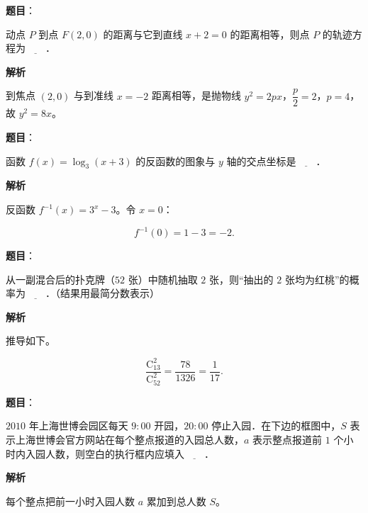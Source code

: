 \begin{answer}

\textbf{题目}：

动点 $P$ 到点 $F(2,0)$ 的距离与它到直线 $x+2=0$ 的距离相等，则点 $P$ 的轨迹方程为$\underline{\qquad}$．

\textbf{解析}

到焦点 $(2,0)$ 与到准线 $x=-2$ 距离相等，是抛物线 $y^2=2px$，$\dfrac p2=2$，$p=4$，故 $y^2=8x$。


\end{answer}
\begin{answer}

\textbf{题目}：

函数 $f(x)=\log_3(x+3)$ 的反函数的图象与 $y$ 轴的交点坐标是$\underline{\qquad}$．

\textbf{解析}

反函数 $f^{-1}(x)=3^x-3$。令 $x=0$：

\nopagebreak[4]
\[f^{-1}(0)=1-3=-2.\]


\end{answer}
\begin{answer}

\textbf{题目}：

从一副混合后的扑克牌（$52$ 张）中随机抽取 $2$ 张，则“抽出的 $2$ 张均为红桃”的概率为$\underline{\qquad}$．（结果用最简分数表示）

\textbf{解析}

推导如下。

\nopagebreak[4]
\[\frac{\mathrm C_{13}^2}{\mathrm C_{52}^2}
=\frac{78}{1326}=\frac1{17}.\]


\end{answer}
\begin{answer}

\textbf{题目}：

$2010$ 年上海世博会园区每天 $9:00$ 开园，$20:00$ 停止入园．在下边的框图中，$S$ 表示上海世博会官方网站在每个整点报道的入园总人数，$a$ 表示整点报道前 $1$ 个小时内入园人数，则空白的执行框内应填入$\underline{\qquad}$．
\nopagebreak[4]
\begin{center}\end{center}
\nopagebreak[4]
\textbf{解析}

每个整点把前一小时入园人数 $a$ 累加到总人数 $S$。


\end{answer}
